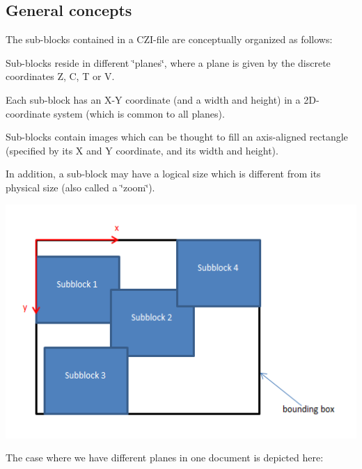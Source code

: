 \subsection*{General concepts}

The sub-\/blocks contained in a C\+Z\+I-\/file are conceptually organized as follows\+:


\begin{DoxyItemize}
\item Sub-\/blocks reside in different \char`\"{}planes\char`\"{}, where a plane is given by the discrete coordinates \textquotesingle{}Z\textquotesingle{}, \textquotesingle{}C\textquotesingle{}, \textquotesingle{}T\textquotesingle{} or \textquotesingle{}V\textquotesingle{}.
\item Each sub-\/block has an X-\/Y coordinate (and a width and height) in a 2\+D-\/coordinate system (which is common to all planes).
\item Sub-\/blocks contain images which can be thought to fill an axis-\/aligned rectangle (specified by its X and Y coordinate, and its width and height).
\item In addition, a sub-\/block may have a logical size which is different from its physical size (also called a \char`\"{}zoom\char`\"{}).
\end{DoxyItemize}


\begin{DoxyImage}
\includegraphics[width=\textwidth,height=\textheight/2,keepaspectratio=true]{image_document_concept1.PNG}
\end{DoxyImage}
 The case where we have different planes in one document is depicted here\+:


